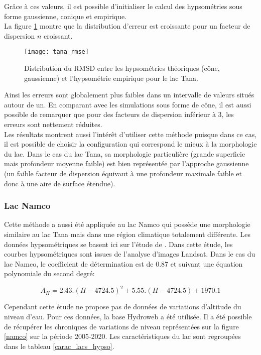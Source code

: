 \noindent Grâce à ces valeurs, il est possible d'initialiser le calcul des hypsométries sous forme gaussienne, conique et empirique.\\

\noindent La figure \ref{tana} montre que la distribution d'erreur est croissante pour un facteur de dispersion $n$ croissant. \\

\begin{figure}[h!]
\texttt{[image: tana\_rmse]}
\caption{Distribution du RMSD entre les hypsométries théoriques (cône, gaussienne) et l'hypsométrie empirique pour le lac Tana.}
\label{tana}
\end{figure}

\noindent Ainsi les erreurs sont globalement plus faibles dans un intervalle de valeurs situés autour de un. En comparant avec les simulations sous forme de cône, il est aussi possible de remarquer que pour des facteurs de dispersion inférieur à 3, les erreurs sont nettement réduites.\\
Les résultats montrent aussi l'intérêt d'utiliser cette méthode puisque dans ce cas, il est possible de choisir la configuration qui correspond le mieux à la morphologie du lac. Dans le cas du lac Tana, sa morphologie particulière (grande superficie mais profondeur moyenne faible) est bien représentée par l'approche gaussienne (un faible facteur de dispersion équivaut à une profondeur maximale faible et donc à une aire de surface étendue).

\subsubsection*{{\selectfont Lac Namco}}

\noindent Cette méthode a aussi été appliquée au lac Namco qui possède une morphologie similaire au lac Tana mais dans une région climatique totalement différente. Les données hypsométriques se basent ici sur l'étude de \citet{li2019}. Dans cette étude, les courbes hypsométriques sont issues de l'analyse d'images Landsat. Dans le cas du lac Namco, le coefficient de détermination est de 0.87 et suivant une équation polynomiale du second degré:

\begin{equation}
A_{H} = 2.43.(H-4724.5)^{2}+5.55.(H-4724.5)+1970.1
\end{equation}

Cependant cette étude ne propose pas de données de variations d'altitude du niveau d'eau. Pour ces données, la base Hydroweb a été utilisée. Il a été possible de récupérer les chroniques de variations de niveau représentées sur la figure \ref{namco} sur la période 2005-2020. Les caractéristiques du lac sont regroupées dans le tableau \ref{carac_lacs_hypso}. \\


